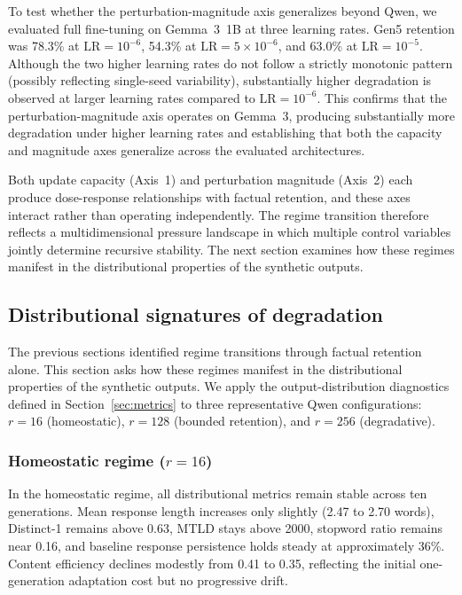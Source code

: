 \documentclass[a4paper,fleqn]{cas-dc}
\begin{document}
To test whether the perturbation-magnitude axis generalizes beyond Qwen, we
evaluated full fine-tuning on Gemma~3~1B at three learning rates. Gen5 retention
was 78.3\% at $\mathrm{LR}=10^{-6}$, 54.3\% at $\mathrm{LR}=5 \times 10^{-6}$,
and 63.0\% at $\mathrm{LR}=10^{-5}$. Although the two higher learning rates do
not follow a strictly monotonic pattern (possibly reflecting single-seed
variability), substantially higher degradation is observed at larger learning
rates compared to $\mathrm{LR}=10^{-6}$. This confirms that the
perturbation-magnitude axis operates on Gemma~3, producing substantially more
degradation under higher learning rates and establishing that both the capacity
and magnitude axes generalize across the evaluated architectures.

Both update capacity (Axis~1) and perturbation magnitude (Axis~2) each produce
dose-response relationships with factual retention, and these axes interact
rather than operating independently. The regime transition therefore reflects a
multidimensional pressure landscape in which multiple control variables jointly
determine recursive stability. The next section examines how these regimes
manifest in the distributional properties of the synthetic outputs.

\subsection{Distributional signatures of degradation}\label{sec:res_distribution}

The previous sections identified regime transitions through factual retention
alone. This section asks how these regimes manifest in the distributional
properties of the synthetic outputs. We apply the output-distribution diagnostics
defined in Section~\ref{sec:metrics} to three representative Qwen configurations:
$r=16$ (homeostatic), $r=128$ (bounded retention), and $r=256$ (degradative).

\subsubsection{Homeostatic regime ($r=16$)}
In the homeostatic regime, all distributional metrics remain stable across ten
generations. Mean response length increases only slightly (2.47 to 2.70 words),
Distinct-1 remains above 0.63, MTLD stays above 2000, stopword ratio remains
near 0.16, and baseline response persistence holds steady at approximately 36\%.
Content efficiency declines modestly from 0.41 to 0.35, reflecting the initial
one-generation adaptation cost but no progressive drift.
\end{document}
